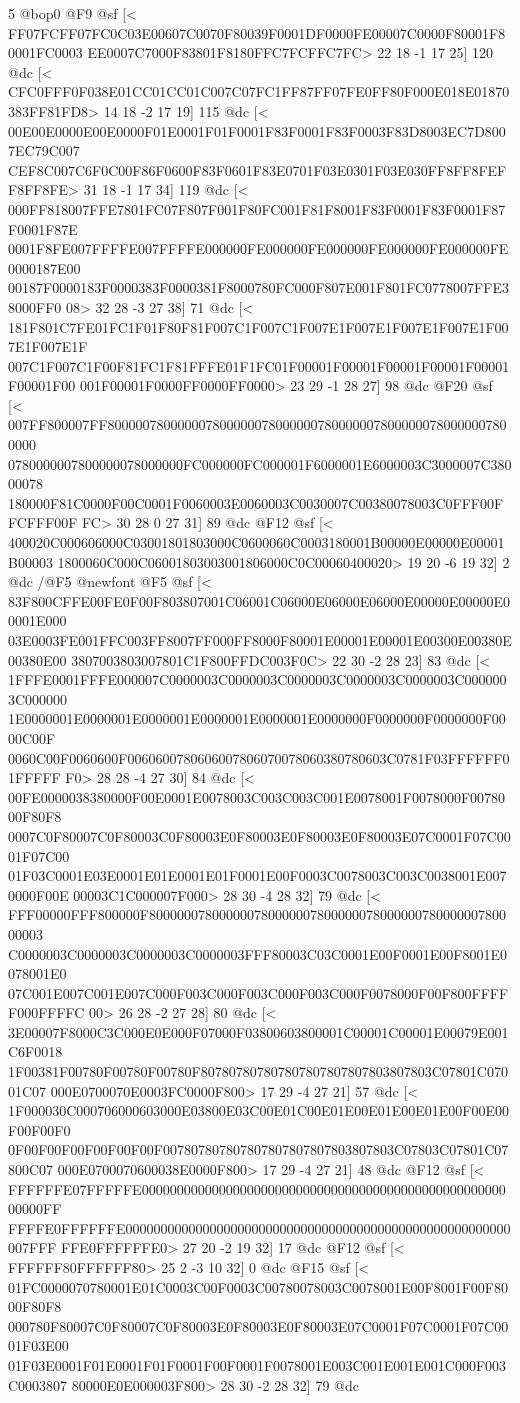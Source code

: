 {{{{{{{{{{{{{{5 @bop0
@F9 @sf
[<
FF07FCFF07FC0C03E00607C0070F80039F0001DF0000FE00007C0000F80001F80001FC0003
EE0007C7000F83801F8180FFC7FCFFC7FC>
	 22 18 -1 17 25] 120 @dc
[<
CFC0FFF0F038E01CC01CC01C007C07FC1FF87FF07FE0FF80F000E018E01870383FF81FD8>
	 14 18 -2 17 19] 115 @dc
[<
00E00E0000E00E0000F01E0001F01F0001F83F0001F83F0003F83D8003EC7D8007EC79C007
CEF8C007C6F0C00F86F0600F83F0601F83E0701F03E0301F03E030FF8FF8FEFF8FF8FE>
	 31 18 -1 17 34] 119 @dc
[<
000FF818007FFE7801FC07F807F001F80FC001F81F8001F83F0001F83F0001F87F0001F87E
0001F8FE007FFFFE007FFFFE000000FE000000FE000000FE000000FE000000FE0000187E00
00187F0000183F0000383F0000381F8000780FC000F807E001F801FC0778007FFE38000FF0
08>
	 32 28 -3 27 38] 71 @dc
[<
181F801C7FE01FC1F01F80F81F007C1F007C1F007E1F007E1F007E1F007E1F007E1F007E1F
007C1F007C1F00F81FC1F81FFFE01F1FC01F00001F00001F00001F00001F00001F00001F00
001F00001F0000FF0000FF0000>
	 23 29 -1 28 27] 98 @dc
@F20 @sf
[<
007FF800007FF8000007800000078000000780000007800000078000000780000007800000
0780000007800000078000000FC000000FC000001F6000001E6000003C3000007C38000078
180000F81C0000F00C0001F0060003E0060003C0030007C00380078003C0FFF00FFCFFF00F
FC>
	 30 28 0 27 31] 89 @dc
@F12 @sf
[<
400020C000606000C03001801803000C0600060C0003180001B00000E00000E00001B00003
1800060C000C06001803003001806000C0C00060400020>
	 19 20 -6 19 32] 2 @dc
/@F5 @newfont
@F5 @sf
[<
83F800CFFE00FE0F00F803807001C06001C06000E06000E06000E00000E00000E00001E000
03E0003FE001FFC003FF8007FF000FF8000F80001E00001E00001E00300E00380E00380E00
3807003803007801C1F800FFDC003F0C>
	 22 30 -2 28 23] 83 @dc
[<
1FFFE0001FFFE000007C0000003C0000003C0000003C0000003C0000003C0000003C000000
1E0000001E0000001E0000001E0000001E0000001E0000000F0000000F0000000F0000C00F
0060C00F0060600F0060600780606007806070078060380780603C0781F03FFFFFF01FFFFF
F0>
	 28 28 -4 27 30] 84 @dc
[<
00FE0000038380000F00E0001E0078003C003C003C001E0078001F0078000F0078000F80F8
0007C0F80007C0F80003C0F80003E0F80003E0F80003E0F80003E07C0001F07C0001F07C00
01F03C0001E03E0001E01E0001E01F0001E00F0003C0078003C003C0038001E0070000F00E
00003C1C000007F000>
	 28 30 -4 28 32] 79 @dc
[<
FFF00000FFF800000F80000007800000078000000780000007800000078000000780000003
C0000003C0000003C0000003C0000003FFF80003C03C0001E00F0001E00F8001E0078001E0
07C001E007C001E007C000F003C000F003C000F003C000F0078000F00F800FFFFF000FFFFC
00>
	 26 28 -2 27 28] 80 @dc
[<
3E00007F8000C3C000E0E000F07000F03800603800001C00001C00001E00079E001C6F0018
1F00381F00780F00780F00780F807807807807807807807807803807803C07801C07001C07
000E0700070E0003FC0000F800>
	 17 29 -4 27 21] 57 @dc
[<
1F000030C000706000603000E03800E03C00E01C00E01E00E01E00E01E00F00E00F00F00F0
0F00F00F00F00F00F00F007807807807807807807807803807803C07803C07801C07800C07
000E0700070600038E0000F800>
	 17 29 -4 27 21] 48 @dc
@F12 @sf
[<
FFFFFFE07FFFFFE000000000000000000000000000000000000000000000000000000000FF
FFFFE0FFFFFFE0000000000000000000000000000000000000000000000000000000007FFF
FFE0FFFFFFE0>
	 27 20 -2 19 32] 17 @dc
@F12 @sf
[<
FFFFFF80FFFFFF80>
	 25 2 -3 10 32] 0 @dc
@F15 @sf
[<
01FC0000070780001E01C0003C00F0003C00780078003C0078001E00F8001F00F8000F80F8
000780F80007C0F80007C0F80003E0F80003E0F80003E07C0001F07C0001F07C0001F03E00
01F03E0001F01E0001F01F0001F00F0001F0078001E003C001E001E001C000F003C0003807
80000E0E000003F800>
	 28 30 -2 28 32] 79 @dc

}}}}}}}}}}}}}}
